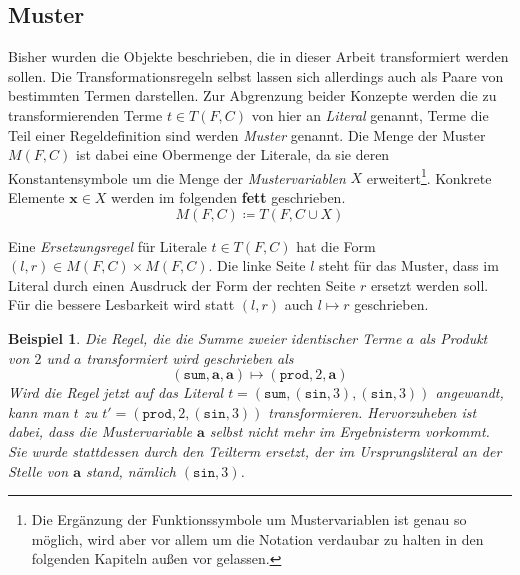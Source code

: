 \subsection{Muster} \label{subsecMuster}

Bisher wurden die Objekte beschrieben, die in dieser Arbeit transformiert werden sollen. Die Transformationsregeln selbst lassen sich allerdings auch als Paare von bestimmten Termen darstellen. Zur Abgrenzung beider Konzepte werden die zu transformierenden Terme $t\in T(F, C)$ von hier an \emph{Literal} genannt, Terme die  Teil einer Regeldefinition sind werden \emph{Muster} genannt. Die Menge der Muster $M(F, C)$ ist dabei eine Obermenge der Literale, da sie deren Konstantensymbole um die Menge der \emph{Mustervariablen} $X$ erweitert\footnote{Die Ergänzung der Funktionssymbole um Mustervariablen ist genau so möglich, wird aber vor allem um die Notation verdaubar zu halten in den folgenden Kapiteln außen vor gelassen.}. Konkrete Elemente $\mathbf x \in X$ werden im folgenden \textbf{fett} geschrieben.
$$M(F, C) \coloneqq T(F, C \cup X)$$

Eine \emph{Ersetzungsregel} für Literale $t \in T(F, C)$ hat die Form $(l, r) \in M(F, C) \times M(F, C)$. Die linke Seite $l$ steht für das Muster, dass im Literal durch einen Ausdruck der Form der rechten Seite $r$ ersetzt werden soll. Für die bessere Lesbarkeit wird statt $(l, r)$ auch $l \mapsto r$ geschrieben.

\newtheorem{bMuster}[bsp]{Beispiel} 
\begin{bMuster} \label{bMuster}
Die Regel, die die Summe zweier identischer Terme $a$ als Produkt von $2$ und $a$ transformiert wird geschrieben als
$$(\texttt{sum}, \mathbf a, \mathbf a) \mapsto (\texttt{prod}, 2, \mathbf a)$$
Wird die Regel jetzt auf das Literal 
$t = (\texttt{sum}, (\texttt{sin}, 3), (\texttt{sin}, 3))$ angewandt, kann man $t$ zu $t' = (\texttt{prod}, 2, (\texttt{sin}, 3))$ transformieren. 
Hervorzuheben ist dabei, dass die Mustervariable $\mathbf a$ selbst nicht mehr im Ergebnisterm vorkommt. Sie wurde stattdessen durch den Teilterm ersetzt, der im Ursprungsliteral an der Stelle von $\mathbf a$ stand, nämlich $(\texttt{sin}, 3)$.
\end{bMuster}

